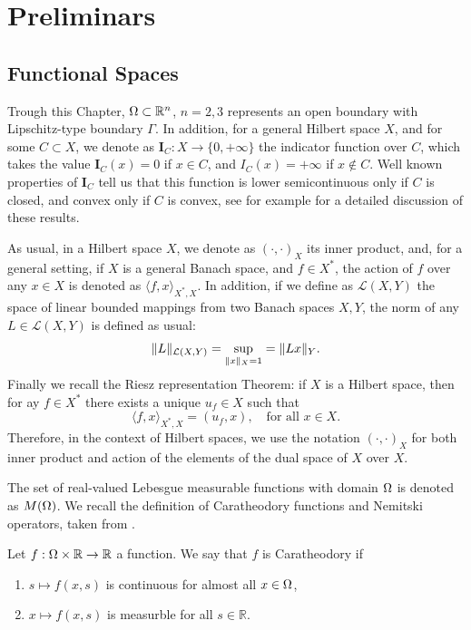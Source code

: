 \chapter{Preliminars}
\section{Functional Spaces}

Trough this Chapter, $\Omega\subset \mathbb{R}^n$, $n=2,3$ represents an open boundary with Lipschitz-type boundary $\Gamma$. In addition, for a general Hilbert space $X$, and for some $C\subset X$, we denote as $\mathbf{I}_{C}:X\to \{0,+\infty\}$ the indicator function over $C$, which takes the value $\mathbf{I}_{C}(x)=0$ if $x\in C$, and $I_{C}(x)=+\infty$ if $x\notin C$. Well known properties of $\mathbf{I}_{C}$ tell us that this function is lower semicontinuous only if $C$ is closed, and convex only if $C$ is convex, see for example \cite{combettes} for a detailed discussion of these results. 

As usual, in a Hilbert space $X$, we denote as $(\cdot,\cdot)_{X}$ its inner product, and, for a general setting, if $X$ is a general Banach space, and $f\in X^*$, the action of $f$ over any $x\in X$ is denoted as $\langle f,x\rangle_{X^{*},X}$. In addition, if we define as $\mathcal{L}(X,Y)$ the space of linear bounded mappings from two Banach spaces $X, Y$, the norm of any $L\in \mathcal{L}(X,Y)$ is defined as usual:
\[
\lVert L \rVert_{\mathcal{L}(X,Y)}=\sup_{\lVert x \rVert_{X}=1}=\lVert Lx \rVert_{Y}.
\]
Finally we recall the Riesz representation Theorem: if $X$ is a Hilbert space, then for ay $f\in X^*$ there exists a unique $u_f\in X$ such that
\[
\langle f, x\rangle_{X^{*},X}=(u_{f},x), \quad \mbox{for all }x\in X.
\]
Therefore, in the context of Hilbert spaces, we use the notation $(\cdot,\cdot)_{X}$ for both inner product and action of the elements of the dual space of $X$ over $X$.

The set of real-valued Lebesgue measurable functions with domain $\Omega$ is denoted as $M(\Omega)$.  We recall the definition of Caratheodory functions and Nemitski operators, taken from \cite{ambrosetti}.

\begin{definition}
    Let $f:\Omega\times \mathbb{R}\to \mathbb{R}$ a function. We say that $f$ is Caratheodory if 
    \begin{enumerate}
        \item $s\mapsto f(x,s)$ is continuous for almost all $x\in \Omega$,
        \item $x\mapsto f(x,s)$ is measurble for all $s\in\mathbb{R}$.
    \end{enumerate}
\end{definition}


